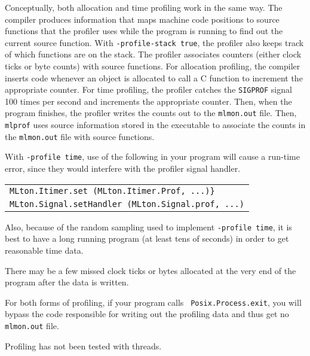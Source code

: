 Conceptually, both allocation and time profiling work in the same way.
The compiler produces information that maps machine code positions to
source functions that the profiler uses while the program is running
to find out the current source function.  With {\tt -profile-stack
true}, the profiler also keeps track of which functions are on the
stack.  The profiler associates counters (either clock ticks or byte
counts) with source functions.  For allocation profiling, the compiler
inserts code whenever an object is allocated to call a C function to
increment the appropriate counter.  For time profiling, the profiler
catches the {\tt SIGPROF} signal 100 times per second and increments
the appropriate counter.  Then, when the program finishes, the
profiler writes the counts out to the {\tt mlmon.out} file.  Then,
{\tt mlprof} uses source information stored in the executable to
associate the counts in the {\tt mlmon.out} file with source
functions.

With {\tt -profile time}, use of the following in your program will
cause a run-time error, since they would interfere with the profiler
signal handler.\\
\begin{tabular}{l}
\tt MLton.Itimer.set (MLton.Itimer.Prof, ...)\}\\
\tt MLton.Signal.setHandler (MLton.Signal.prof, ...)
\end{tabular}
Also, because of the random sampling used to implement {\tt -profile
time}, it is best to have a long running program (at least tens of
seconds) in order to get reasonable time data.

There may be a few missed clock ticks or bytes allocated at the
very end of the program after the data is written.

For both forms of profiling, if your program calls {\tt
Posix.Process.exit}, you will bypass the code responsible for writing
out the profiling data and thus get no {\tt mlmon.out} file.

Profiling has not been tested with threads.
